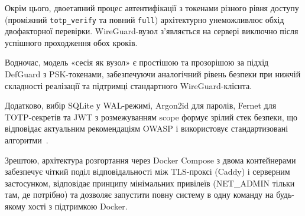 Окрім цього, двоетапний процес автентифікації з токенами різного рівня
доступу (проміжний \texttt{totp\_verify} та повний \texttt{full})
архітектурно унеможливлює обхід двофакторної перевірки. WireGuard-вузол
з'являється на сервері виключно після успішного проходження обох кроків.

Водночас, модель «сесія як вузол» є простішою та прозорішою за підхід
DefGuard з PSK-токенами, забезпечуючи аналогічний рівень безпеки
при нижчій складності реалізації та підтримці стандартного WireGuard-клієнта.

Додатково, вибір SQLite у WAL-режимі, Argon2id для паролів, Fernet для
TOTP-секретів та JWT з розмежуванням scope формує зрілий стек безпеки,
що відповідає актуальним рекомендаціям OWASP і використовує стандартизовані
алгоритми~\cite{owasp_password_storage, rfc7519, rfc6238}.

Зрештою, архітектура розгортання через Docker Compose з двома контейнерами
забезпечує чіткий поділ відповідальності між TLS-проксі (Caddy) і
серверним застосунком, відповідає принципу мінімальних привілеїв
(NET\_ADMIN тільки там, де потрібно) та дозволяє запустити повну систему
в одну команду на будь-якому хості з підтримкою Docker.

\newpage

